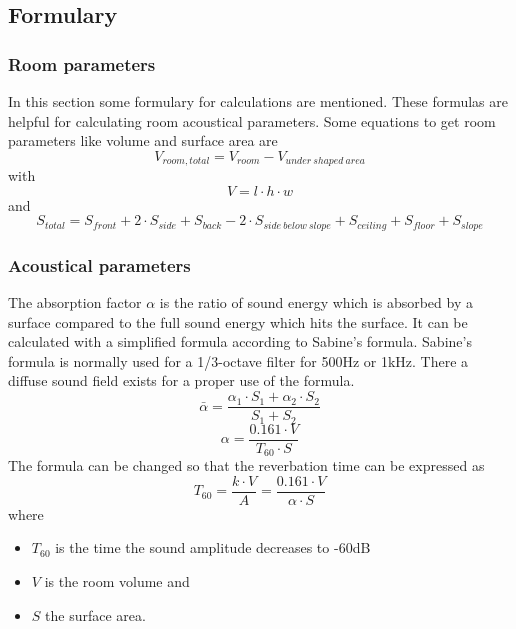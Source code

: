 \documentclass{article}
\begin{document}
\subsection{Formulary}
\subsubsection{Room parameters}
In this section some formulary for calculations are mentioned. These formulas are helpful for calculating room acoustical parameters.
Some equations to get room parameters like volume and surface area are
\begin{equation}
V_{room,total}=V_{room}-V_{under\ shaped\ area}
\end{equation}
with
\begin{equation}
V=l\cdot h\cdot w
\end{equation}
and
\begin{equation}
S_{total}=S_{front}+2\cdot S_{side}+S_{back}-2\cdot S_{side\ below\ slope}+S_{ceiling}+S_{floor}+S_{slope}
\end{equation}
\subsubsection{Acoustical parameters}
The absorption factor $\alpha$ is the ratio of sound energy which is absorbed by a surface compared to the full sound energy which hits the surface. It can be calculated with a simplified formula according to Sabine's formula. Sabine's formula is normally used for a 1/3-octave filter for 500Hz or 1kHz. There a diffuse sound field exists for a proper use of the formula.
\begin{equation}
\bar{\alpha}=\frac{\alpha_1\cdot S_1+\alpha_2\cdot S_2}{S_1+S_2}
\end{equation}
\begin{equation}
\alpha=\frac{0.161\cdot V}{T_{60}\cdot S}
\end{equation}
The formula can be changed so that the reverbation time can be expressed as
\begin{equation}
T_{60}=\frac{k\cdot V}{A}=\frac{0.161\cdot V}{\alpha\cdot S}
\end{equation}
where 
\begin{itemize}
\item $T_{60}$ is the time the sound amplitude decreases to -60dB
\item $V$ is the room volume and
\item $S$ the surface area.
\end{itemize}
\end{document}
